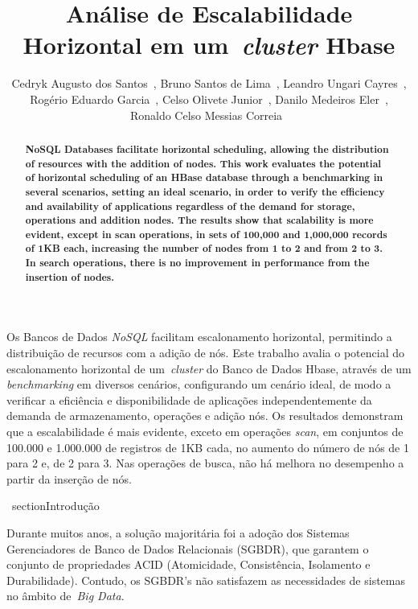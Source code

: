 \documentclass[12pt]{article}
\title{Análise de Escalabilidade Horizontal em um~\emph{cluster}  Hbase}
\author{Cedryk Augusto dos Santos~\inst{1}, Bruno Santos de Lima~\inst{1}, Leandro Ungari Cayres~\inst{1},\\Rogério Eduardo Garcia~\inst{1}, Celso Olivete Junior~\inst{1}, Danilo Medeiros Eler~\inst{1},\\ Ronaldo Celso Messias Correia~\inst{1}}
\begin{document}
 

\maketitle


\begin{abstract}
\textbf{NoSQL Databases facilitate horizontal scheduling, allowing the distribution of resources with the addition of nodes. This work evaluates the potential of horizontal scheduling of an HBase database through a benchmarking in several scenarios, setting an ideal scenario, in order to verify the efficiency and availability of applications regardless of the demand for storage, operations and addition nodes. The results show that scalability is more evident, except in scan operations, in sets of 100,000 and 1,000,000 records of 1KB each, increasing the number of nodes from 1 to 2 and from 2 to 3. In search operations, there is no improvement in performance from the insertion of nodes.}
\end{abstract}
     
\begin{resumo} 
Os Bancos de Dados \emph{NoSQL} facilitam escalonamento horizontal, permitindo a distribuição de recursos com a adição de nós. Este trabalho avalia o potencial do escalonamento horizontal de um~\emph{cluster} do Banco de Dados Hbase, através de um \emph{benchmarking} em diversos cenários, configurando um cenário ideal, de modo a verificar a eficiência e disponibilidade de aplicações independentemente da demanda de armazenamento, operações e adição nós. Os resultados demonstram que a escalabilidade é mais evidente, exceto em operações \emph{scan}, em conjuntos de 100.000 e 1.000.000 de registros de 1KB cada, no aumento do número de nós de 1 para 2 e, de 2 para 3. Nas operações de busca, não há melhora no desempenho a partir da inserção de nós.
\end{resumo}


\	section{Introdução}
\label{sec:introducao}
 
Durante muitos anos, a solução majoritária foi a adoção dos Sistemas Gerenciadores de Banco de Dados Relacionais (SGBDR), que garantem o conjunto de propriedades ACID (Atomicidade, Consistência, Isolamento e Durabilidade). Contudo, os SGBDR’s não satisfazem as necessidades de sistemas no âmbito de~\emph{Big Data}.%
 
\end{document}
